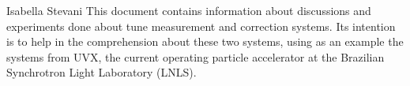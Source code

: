 \documentclass[a4paper, 12pt]{./Template/lnls-note}
\numberwithin{equation}{section} %
\newcommand*\blankpage{\newpage\null\thispagestyle{empty}\newpage}
\begin{document}
{Isabella Stevani}{\LNLS}
{This document contains information about discussions and experiments done about tune measurement and correction systems. Its intention is to help in the comprehension about these two systems, using as an example the systems from UVX, the current operating particle accelerator at the Brazilian Synchrotron Light Laboratory (LNLS).}

\blankpage
\newpage
\tableofcontents
\thispagestyle{empty}
\blankpage

\newpage
\setcounter{page}{5}

\newpage

\end{document}
